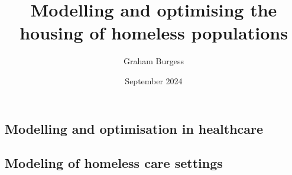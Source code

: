 \message{ !name(TenMonthReview.tex)}\documentclass{article}
\title{Modelling and optimising the housing of homeless populations}
\author{Graham Burgess}
\date{September 2024}
\begin{document}


\subsection{Modelling and optimisation in healthcare}
\subsection{Modeling of homeless care settings}
\end{document}
